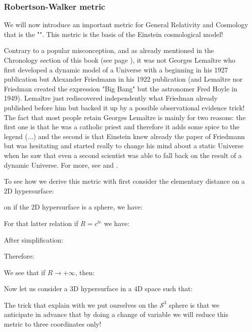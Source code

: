 	\subsubsection{Robertson-Walker metric}
	We will now introduce an important metric for General Relativity and Cosmology that is the "". This metric is the basis of the Einstein cosmological model!
	
	\begin{tcolorbox}[title=Remark,colframe=black,arc=10pt]
	Contrary to a popular misconception, and as already mentioned in the Chronology section of this book (see page \pageref{chronology}), it was not Georges Lemaître who first developed a dynamic model of a Universe with a beginning in his 1927 publication \cite{lemaitre1927univers} but Alexander Friedmann in his 1922 publication \cite{friedman1922krummung} (and Lemaître nor Friedman created the expression "Big Bang" but the astronomer Fred Hoyle in 1949). Lemaître just rediscovered independently what Friedman already published before him but backed it up by a possible observational evidence trick! The fact that most people retain Georges Lemaître is mainly for two reasons: the first one is that he was a catholic priest and therefore it adds some spice to the legend (...) and the second is that Einstein knew already the paper of Friedmann but was hesitating and started really to change his mind about a static Universe when he saw that even a second scientist was able to fall back on the result of a dynamic Universe. For more, see \cite{frenkel1994einstein} and \cite{nussbaumer2014einstein}.
	\end{tcolorbox}
	
	To see how we derive this metric with first consider the elementary distance on a $2$D hypersurface:
	
	on if the $2$D hypersurface is a sphere, we have:
	
	For that latter relation if $R=c^{te}$ we have:
	
	After simplification:
	
	Therefore:
	
	We see that if $R\rightarrow +\infty$, then:
	
	Now let us consider a $3$D hypersurface in a $4$D space such that:
	
	The trick that explain with we put ourselves on the $\mathcal{S}^3$ sphere is that we anticipate in advance that by doing a change of variable we will reduce this metric to three coordinates only!
	

